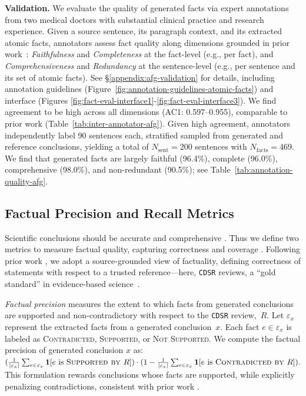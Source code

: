\documentclass{article}
\newcommand{\xhdr}[1]{%
  \noindent\textbf{#1.}
}
\begin{document}
\xhdr{Validation} We evaluate the quality of generated facts via expert annotations from two medical doctors with substantial clinical practice and research experience. Given a source sentence, its paragraph context, and its extracted atomic facts, annotators assess fact quality along dimensions grounded in prior work~\cite{kaur2025whosaskingsimulatingrolebased, liu-etal-2025-verifact, mir-etal-2019-evaluating, park-etal-2024-valuescope}: \textit{Faithfulness} and \textit{Completeness} at the fact-level (e.g., per fact), and \textit{Comprehensiveness} and \textit{Redundancy} at the sentence-level (e.g., per sentence and its set of atomic facts). See \S\ref{appendix:afg-validation} for details, including annotation guidelines (Figure~\ref{fig:annotation-guidelines-atomic-facts}) and interface (Figures \ref{fig:fact-eval-interface1}-\ref{fig:fact-eval-interface3}).
We find agreement to be high across all dimensions (AC1: 0.597–0.955), comparable to prior work (Table~\ref{tab:inter-annotator-afg}). Given high agreement, annotators independently label 90 sentences each, stratified sampled from generated and reference conclusions, yielding a total of $N_{\text{sent}}{=}200$ sentences with $N_{\text{facts}}{=}469$. We find that generated facts are largely faithful (96.4\%), complete (96.0\%), comprehensive (98.0\%), and non-redundant (90.5\%); see Table~\ref{tab:annotation-quality-afg}.





\subsection{Factual Precision and Recall Metrics}\label{sec:factual-metrics}
Scientific conclusions should be accurate and comprehensive \cite{tang2023evaluating}. Thus we define two metrics to measure factual quality, capturing correctness and coverage \cite{liu-etal-2025-verifact, min-etal-2023-factscore}. Following prior work \cite{liu-etal-2025-verifact, min-etal-2023-factscore, wadden-etal-2022-scifact}, we adopt a source-grounded view of factuality, defining correctness of statements with respect to a trusted reference---here, \texttt{CDSR} reviews, a ``gold standard'' in evidence-based science~\cite{smith2013cochrane}.

\textit{Factual precision} measures the extent to which facts from generated conclusions are supported and non-contradictory with respect to the \texttt{CDSR} review,~$R$. Let $\varepsilon_x$ represent the extracted facts from a generated conclusion~$x$. Each fact $e \in \varepsilon_x$ is labeled as \textsc{Contradicted}, \textsc{Supported}, or \textsc{Not Supported}. We compute the factual precision of generated conclusion $x$ as: $(\frac{1}{|\varepsilon_x|} \sum_{e \in \varepsilon_x} \mathbf{1}[e \text{ is } \textsc{Supported by } R]) \cdot (1 - \frac{1}{|\varepsilon_x|} \sum_{e \in \varepsilon_x} \mathbf{1}[e \text{ is } \textsc{Contradicted by } R]).$ This formulation rewards conclusions whose facts are supported, while explicitly penalizing contradictions, consistent with prior work \cite{cheng2025facts, liu-etal-2025-verifact, min-etal-2023-factscore}.
\end{document}
